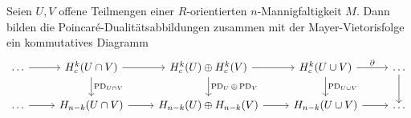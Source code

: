 \begin{proposition}[{name=[{Mayer-Vietoris-Leiter mit Dualitätsabbildungen}]}]
	Seien $U,V$ offene Teilmengen einer $R$-orientierten $n$-Mannigfaltigkeit $M$. 
	Dann bilden die Poincaré-Dualitätsabbildungen zusammen mit der Mayer-Vietorisfolge ein kommutatives Diagramm
	\[
		\begin{tikzcd}
			\ldots \rar & H^k_c(U \cap V) \rar \dar["\PD_{U \cap V}"] & H^k_c(U) \oplus H^k_c(V) \dar["\PD_{U} \oplus \PD_{V}"] \rar & H^k_c(U \cup V) \rar["\partial"] \dar["\PD_{U \cup V}"]& \ldots \dar \\
			\ldots \rar & H_{n-k}(U \cap V) \rar & H_{n-k}(U) \oplus H_{n-k}(V) \rar & H_{n-k}(U \cup V) \rar & \ldots 
		\end{tikzcd}
	\]
\end{proposition}
